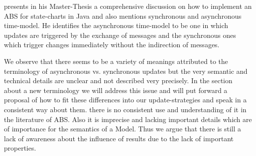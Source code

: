 \cite{yuxuan_agent-based_2016} presents in his Master-Thesis a comprehensive discussion on how to implement an ABS for state-charts in Java and also mentions synchronous and asynchronous time-model. He identifies the asynchronous time-model to be one in which updates are triggered by the exchange of messages and the synchronous ones which trigger changes immediately without the indirection of messages.

\medskip

We observe that there seems to be a variety of meanings attributed to the terminology of asynchronous vs. synchronous updates but the very semantic and technical details are unclear and not described very precisely. In the section about a new terminology we will address this issue and will put forward a proposal of how to fit these differences into our update-strategies and speak in a consistent way about them.
there is no consistent use and understanding of it in the literature of ABS. Also it is imprecise and lacking important details which are of importance for the semantics of a Model. Thus we argue that there is still a lack of awareness about the influence of results due to the lack of important properties.
